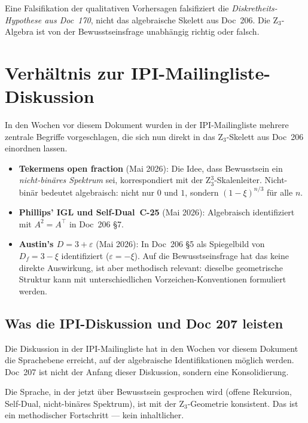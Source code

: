 \begin{interpretation}
Eine Falsifikation der qualitativen Vorhersagen falsifiziert die \emph{Diskretheits-Hypothese aus Doc~170}, nicht das algebraische Skelett aus Doc~206. Die Z$_3$-Algebra ist von der Bewusstseinsfrage unabhängig richtig oder falsch.
\end{interpretation}

\section{Verhältnis zur IPI-Mailingliste-Diskussion}\label{sec:ipi}

In den Wochen vor diesem Dokument wurden in der IPI-Mailingliste mehrere zentrale Begriffe vorgeschlagen, die sich nun direkt in das Z$_3$-Skelett aus Doc~206 einordnen lassen.

\begin{itemize}
\item \textbf{Tekermens \glqq open fraction\grqq{}} (Mai 2026): Die Idee, dass Bewusstsein ein \emph{nicht-binäres Spektrum} sei, korrespondiert mit der Z$_3^3$-Skalenleiter. \glqq Nicht-binär\grqq{} bedeutet algebraisch: nicht nur $0$ und $1$, sondern $(1-\xi)^{n/3}$ für alle $n$.
\item \textbf{Phillips' IGL und Self-Dual~C-25} (Mai 2026): Algebraisch identifiziert mit $A^2 = A^\top$ in Doc~206 \S7.
\item \textbf{Austin's $D = 3 + \varepsilon$} (Mai 2026): In Doc~206 \S5 als Spiegelbild von $D_f = 3 - \xi$ identifiziert ($\varepsilon = -\xi$). Auf die Bewusstseinsfrage hat das keine direkte Auswirkung, ist aber methodisch relevant: dieselbe geometrische Struktur kann mit unterschiedlichen Vorzeichen-Konventionen formuliert werden.
\end{itemize}

\subsection{Was die IPI-Diskussion und Doc 207 leisten}

Die Diskussion in der IPI-Mailingliste hat in den Wochen vor diesem Dokument die Sprachebene erreicht, auf der algebraische Identifikationen möglich werden. Doc~207 ist nicht der Anfang dieser Diskussion, sondern eine Konsolidierung.

Die Sprache, in der jetzt über Bewusstsein gesprochen wird (offene Rekursion, Self-Dual, nicht-binäres Spektrum), ist mit der Z$_3$-Geometrie konsistent. Das ist ein methodischer Fortschritt — kein inhaltlicher.

